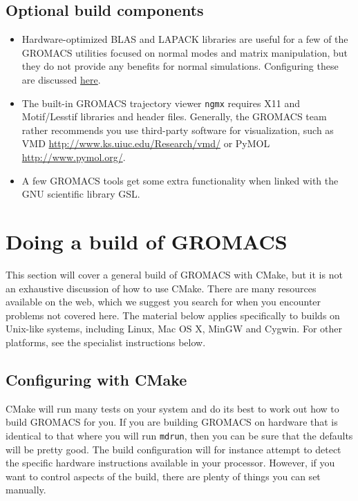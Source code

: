 \documentclass{article}[12pt,a4paper,twoside]
\newcommand{\gromacs}{GROMACS}
\newcommand{\cmake}{CMake}
\newcommand{\blas}{BLAS}
\newcommand{\lapack}{LAPACK}
\newcommand{\vmd}{VMD}
\newcommand{\pymol}{PyMOL}
\begin{document}
\subsection{Optional build components}

\begin{itemize}
\item Hardware-optimized \blas{} and \lapack{} libraries are useful
  for a few of the \gromacs{} utilities focused on normal modes and
  matrix manipulation, but they do not provide any benefits for normal
  simulations. Configuring these are discussed
  \hyperlink{linear-algebra}{here}.
\item The built-in \gromacs{} trajectory viewer \verb+ngmx+ requires
  X11 and Motif/Lesstif libraries and header files. Generally, the
  \gromacs{} team rather recommends you use third-party software for
  visualization, such as \vmd{}
  \url{http://www.ks.uiuc.edu/Research/vmd/} or \pymol{}
  \url{http://www.pymol.org/}.
\item A few \gromacs{} tools get some extra functionality when linked with the
GNU scientific library GSL.
\end{itemize}

\section{Doing a build of \gromacs}

This section will cover a general build of \gromacs{} with \cmake{},
but it is not an exhaustive discussion of how to use \cmake{}. There
are many resources available on the web, which we suggest you search
for when you encounter problems not covered here. The material below
applies specifically to builds on Unix-like systems, including Linux,
Mac OS X, MinGW and Cygwin. For other platforms, see the specialist
instructions below.

\subsection{Configuring with \cmake{}}

\cmake{} will run many tests on your system and do its best to work
out how to build \gromacs{} for you. If you are building \gromacs{} on
hardware that is identical to that where you will run \verb+mdrun+,
then you can be sure that the defaults will be pretty good. The build
configuration will for instance attempt to detect the specific hardware
instructions available in your processor. However, if
you want to control aspects of the build, there are plenty of things you
can set manually.
\end{document}
